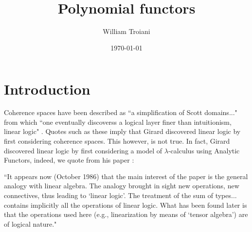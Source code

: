 \documentclass[12pt]{article}
\title{Polynomial functors}
\author{William Troiani}
\date{\today}
\theoremstyle{plain}
\theoremstyle{definition}
\begin{document}
	\maketitle
	\tableofcontents
	
	\section{Introduction}
	Coherence spaces have been described as ``a simplification of Scott domains..." from which ``one eventually discoverss a logical layer finer than intuitionism, linear logic" \cite{BS}. Quotes such as these imply that Girard discovered linear logic by first considering coherence spaces. This however, is not true. In fact, Girard discovered linear logic by first considering a model of $\lambda$-calculus using Analytic Functors, indeed, we quote from his paper \cite{Girard}:
	
	\begin{displayquote}
		``It appears now (October 1986) that the main interest of the paper is the general analogy with linear algebra. The analogy brought in sight new operations, new connectives, thus leading to `linear logic'. The treatment of the sum of types... contains implicitly all the operations of linear logic. What has been found later is that the operations used here (e.g., linearization by means of `tensor algebra') are of logical nature."
		\end{displayquote}
	
	
	
\end{document}
